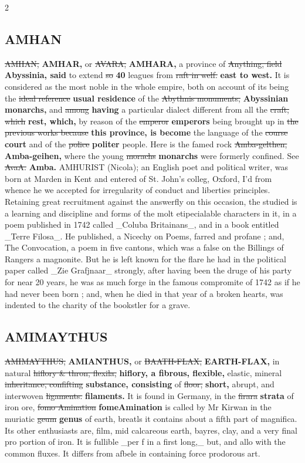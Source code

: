 \documentclass[10pt]{article}
\begin{document}
\begin{multicols}{2}
\subsection*{AMHAN}
\sout{AMHAN,} \textbf{AMHAR,} or \sout{AVARA,} \textbf{AMHARA,} a province of \sout{Anything, field} \textbf{Abyssinia, said} to extend \sout{so} \textbf{40} leagues from \sout{raft in welf.} \textbf{east to west.} It is considered as the most noble in the whole empire, both on account of its being the \sout{ideal reference} \textbf{usual residence} of the \sout{Abythnis monuments,} \textbf{Abyssinian monarchs,} and \sout{among} \textbf{having} a particular dialect different from all the \sout{craft, which} \textbf{rest, which,} by reason of the \sout{emperor} \textbf{emperors} being brought up in \sout{the previous works because} \textbf{this province, is become} the language of the \sout{course} \textbf{court} and of the \sout{police} \textbf{politer} people. Here is the famed rock \sout{Amba-gelthen,} \textbf{Amba-geihen,} where the young \sout{morachs} \textbf{monarchs} were formerly confined. See \sout{AvaA.} \textbf{Amba.} AMHURIST (Nicola); an English poet and political writer, was born at Marden in Kent and entered of St. John's colleg, Oxford, I’d from whence he we accepted for irregularity of conduct and liberties principles. Retaining great recruitment against the answerfly on this occasion, the studied is a learning and discipline and forms of the molt etipecialable characters in it, in a poem published in 1742 called \_Coluba Britainans\_, and in a book entitled \_Terre Filosa\_. He published, a Nicechy on Poems, farred and profane ; and, The Convocation, a poem in five cantons, which was a false on the Billings of Rangers a magnonite. But he is left known for the flare he had in the political paper called \_Zie Grafjnaar\_ strongly, after having been the druge of his party for near 20 years, he was as much forge in the famous compromite of 1742 as if he had never been born ; and, when he died in that year of a broken hearts, was indented to the charity of the bookstler for a grave.

\subsection*{AMIMAYTHUS}
\sout{AMIMAYTHUS,} \textbf{AMIANTHUS,} or \sout{BAATH-FLAX,} \textbf{EARTH-FLAX,} in natural \sout{hiflory \& thron, flexila,} \textbf{hiflory, a fibrous, flexible,} elastic, mineral \sout{inheritance, confifting} \textbf{substance, consisting} of \sout{floor,} \textbf{short,} abrupt, and interwoven \sout{ligaments.} \textbf{filaments.} It is found in Germany, in the \sout{firara} \textbf{strata} of iron ore, \sout{fomo Amination} \textbf{fomeAmination} is called by Mr Kirwan in the muriatic \sout{geum} \textbf{genus} of earth, breatls it contains about a fifth part of magnifica. Its other enthusiasts are, film, mid calcareous earth, bayres, clay, and a very final pro portion of iron. It is fullible \_per f in a first long,\_ but, and allo with the common fluxes. It differs from afbele in containing force prodorous art.


\end{multicols}
\end{document}
